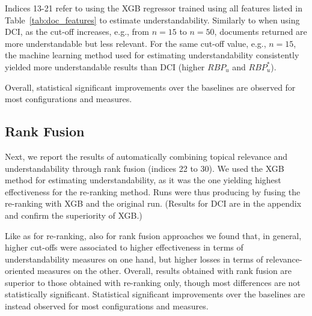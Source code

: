 Indices 13-21 refer to using the XGB regressor trained using all features listed in Table~\ref{tab:doc_features} to estimate understandability. Similarly to when using DCI, as the cut-off increases, e.g., from $n=15$ to $n=50$, documents returned are more understandable but less relevant. For the same cut-off value, e.g., $n=15$, the machine learning method used for estimating understandability consistently yielded more understandable results than DCI (higher $RBP_u$ and $RBP_u^*$). 

Overall, statistical significant improvements over the baselines are observed for most configurations and measures.  


\subsection{Rank Fusion}
\label{results:fusion}

Next, we report the results of automatically combining topical relevance and understandability through rank fusion (indices 22 to 30). We used the XGB method for estimating understandability, as it was the one yielding highest effectiveness for the re-ranking method. Runs were thus producing by fusing the re-ranking with XGB and the original run. (Results for DCI are in the appendix and confirm the superiority of XGB.) 

Like as for re-ranking, also for rank fusion approaches we found that, in general, higher cut-offs were associated to higher effectiveness in terms of understandability measures on one hand, but higher losses in terms of relevance-oriented measures on the other. Overall, results obtained with rank fusion are superior to those obtained with re-ranking only, though most differences are not statistically significant. Statistical significant improvements over the baselines are instead observed for most configurations and measures.  

